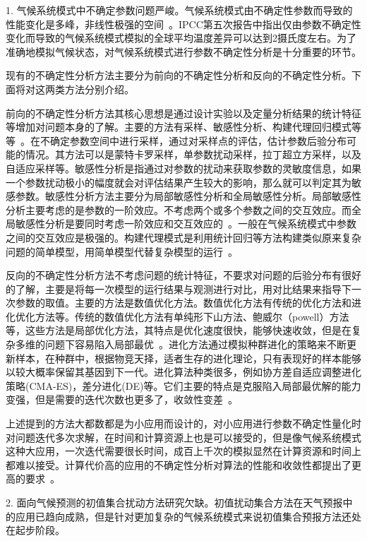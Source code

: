 1. 气候系统模式中不确定参数问题严峻。气候系统模式由不确定性参数而导致的性能变化是多峰，非线性极强的空间~\cite{zhang2015automatic}。IPCC第五次报告中指出仅由参数不确定性变化而导致的气候系统模式模拟的全球平均温度差异可以达到2摄氏度左右。为了准确地模拟气候状态，对气候系统模式进行参数不确定性分析是十分重要的环节。

现有的不确定性分析方法主要分为前向的不确定性分析和反向的不确定性分析。下面将对这两类方法分别介绍。

前向的不确定性分析方法其核心思想是通过设计实验以及定量分析结果的统计特征等增加对问题本身的了解。主要的方法有采样、敏感性分析、构建代理回归模式等等~\cite{neelin2010considerations}。在不确定参数空间中进行采样，通过对采样点的评估，估计参数后验分布可能的情况。其方法可以是蒙特卡罗采样，单参数扰动采样，拉丁超立方采样，以及自适应采样等。敏感性分析是指通过对参数的扰动来获取参数的灵敏度信息，如果一个参数扰动极小的幅度就会对评估结果产生较大的影响，那么就可以判定其为敏感参数。敏感性分析方法主要分为局部敏感性分析和全局敏感性分析。局部敏感性分析主要考虑的是参数的一阶效应。不考虑两个或多个参数之间的交互效应。而全局敏感性分析是要同时考虑一阶效应和交互效应的~\cite{saltelli1995sensitivity,song2015global}。一般在气候系统模式中参数之间的交互效应是极强的。构建代理模式是利用统计回归等方法构建类似原来复杂问题的简单模型，用简单模型代替复杂模型的运行~\cite{xu2018parameter,muller2015ch4}。

反向的不确定性分析方法不考虑问题的统计特征，不要求对问题的后验分布有很好的了解，主要是将每一次模型的运行结果与观测进行对比，用对比结果来指导下一次参数的取值。主要的方法是数值优化方法。数值优化方法有传统的优化方法和进化优化方法等。传统的数值优化方法有单纯形下山方法、鲍威尔（powell）方法等，这些方法是局部优化方法，其特点是优化速度很快，能够快速收敛，但是在复杂多维的问题下容易陷入局部最优~\cite{severijns2005optimizing}。进化方法通过模拟种群进化的策略来不断更新样本，在种群中，根据物竞天择，适者生存的进化理论，只有表现好的样本能够以较大概率保留其基因到下一代。进化算法种类很多，例如协方差自适应调整进化策略(CMA-ES)，差分进化(DE)等。它们主要的特点是克服陷入局部最优解的能力变强，但是需要的迭代次数也更多了，收敛性变差~\cite{auger2012tutorial,Storn1997Differential}。

上述提到的方法大都数都是为小应用而设计的，对小应用进行参数不确定性量化时对问题迭代多次求解，在时间和计算资源上也是可以接受的，但是像气候系统模式这种大应用，一次迭代需要很长时间，成百上千次的模拟显然在计算资源和时间上都难以接受。计算代价高的应用的不确定性分析对算法的性能和收敛性都提出了更高的要求~\cite{zhang2015automatic}。

2. 面向气候预测的初值集合扰动方法研究欠缺。初值扰动集合方法在天气预报中的应用已趋向成熟，但是针对更加复杂的气候系统模式来说初值集合预报方法还处在起步阶段。

